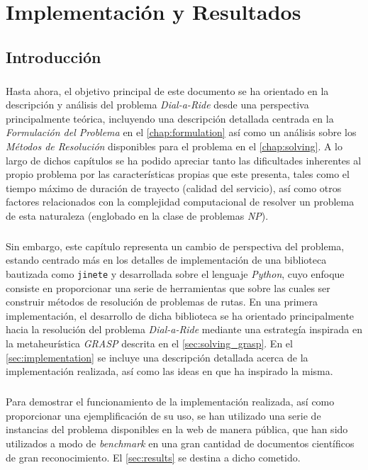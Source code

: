 \documentclass{subfiles}
\begin{document}
  \chapter{Implementación y Resultados}
  \label{chap:implementation_results}

    \section{Introducción}
    \label{sec:implementation_results_introduction}

      \paragraph{}
      Hasta ahora, el objetivo principal de este documento se ha orientado en la descripción y análisis del problema \emph{Dial-a-Ride} desde una perspectiva principalmente teórica, incluyendo una descripción detallada centrada en la \emph{Formulación del Problema} en el \cref{chap:formulation} así como un análisis sobre los \emph{Métodos de Resolución} disponibles para el problema en el \cref{chap:solving}. A lo largo de dichos capítulos se ha podido apreciar tanto las dificultades inherentes al propio problema por las características propias que este presenta, tales como el tiempo máximo de duración de trayecto (calidad del servicio), así como otros factores relacionados con la complejidad computacional de resolver un problema de esta naturaleza (englobado en la clase de problemas \emph{NP}).

      \paragraph{}
      Sin embargo, este capítulo representa un cambio de perspectiva del problema, estando centrado más en los detalles de implementación de una biblioteca bautizada como \texttt{jinete} y desarrollada sobre el lenguaje \emph{Python}, cuyo enfoque consiste en proporcionar una serie de herramientas que sobre las cuales ser construir métodos de resolución de problemas de rutas. En una primera implementación, el desarrollo de dicha biblioteca se ha orientado principalmente hacia la resolución del problema \emph{Dial-a-Ride} mediante una estrategía inspirada en la metaheurística \emph{GRASP} descrita en el \cref{sec:solving_grasp}. En el \cref{sec:implementation} se incluye una descripción detallada acerca de la implementación realizada, así como las ideas en que ha inspirado la misma.

      \paragraph{}
      Para demostrar el funcionamiento de la implementación realizada, así como proporcionar una ejemplificación de su uso, se han utilizado una serie de instancias del problema disponibles en la web de manera pública, que han sido utilizados a modo de \emph{benchmark} en una gran cantidad de documentos científicos de gran reconocimiento. El \cref{sec:results} se destina a dicho cometido.
\end{document}
